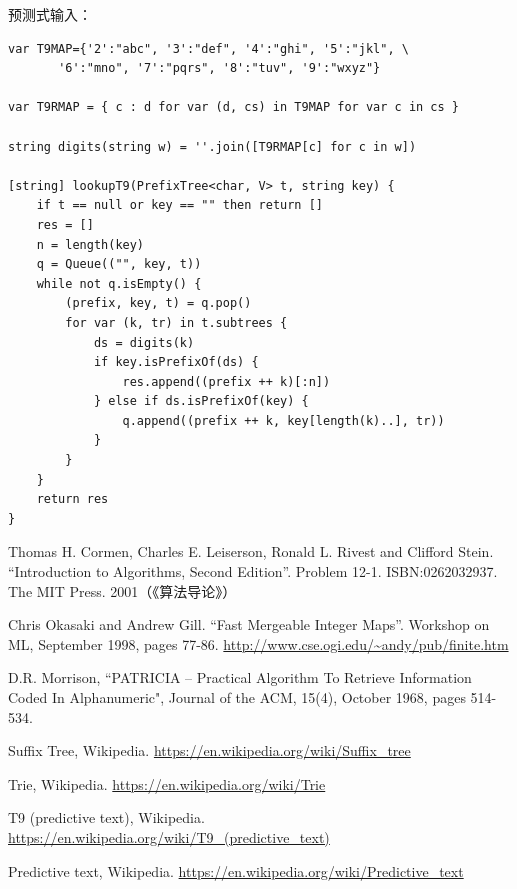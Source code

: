 \documentclass[b5paper]{ctexart}
\begin{document}
预测式输入：
\begin{lstlisting}[language = Bourbaki]
var T9MAP={'2':"abc", '3':"def", '4':"ghi", '5':"jkl", \
       '6':"mno", '7':"pqrs", '8':"tuv", '9':"wxyz"}

var T9RMAP = { c : d for var (d, cs) in T9MAP for var c in cs }

string digits(string w) = ''.join([T9RMAP[c] for c in w])

[string] lookupT9(PrefixTree<char, V> t, string key) {
    if t == null or key == "" then return []
    res = []
    n = length(key)
    q = Queue(("", key, t))
    while not q.isEmpty() {
        (prefix, key, t) = q.pop()
        for var (k, tr) in t.subtrees {
            ds = digits(k)
            if key.isPrefixOf(ds) {
                res.append((prefix ++ k)[:n])
            } else if ds.isPrefixOf(key) {
                q.append((prefix ++ k, key[length(k)..], tr))
            }
        }
    }
    return res
}
\end{lstlisting}

\ifx\wholebook\relax\else
\begin{thebibliography}{99}

Thomas H. Cormen, Charles E. Leiserson, Ronald L. Rivest and Clifford Stein.
``Introduction to Algorithms, Second Edition''. Problem 12-1. ISBN:0262032937. The MIT Press. 2001（《算法导论》）

Chris Okasaki and Andrew Gill. ``Fast Mergeable Integer Maps''. Workshop on ML, September 1998, pages 77-86.  \url{http://www.cse.ogi.edu/~andy/pub/finite.htm}

D.R. Morrison, ``PATRICIA -- Practical Algorithm To Retrieve  Information Coded In Alphanumeric", Journal of the ACM, 15(4), October 1968, pages 514-534.

Suffix Tree, Wikipedia. \url{https://en.wikipedia.org/wiki/Suffix_tree}

Trie, Wikipedia. \url{https://en.wikipedia.org/wiki/Trie}

T9 (predictive text), Wikipedia. \url{https://en.wikipedia.org/wiki/T9_(predictive_text)}

Predictive text,
Wikipedia. \url{https://en.wikipedia.org/wiki/Predictive_text}

\end{thebibliography}
\end{document}
